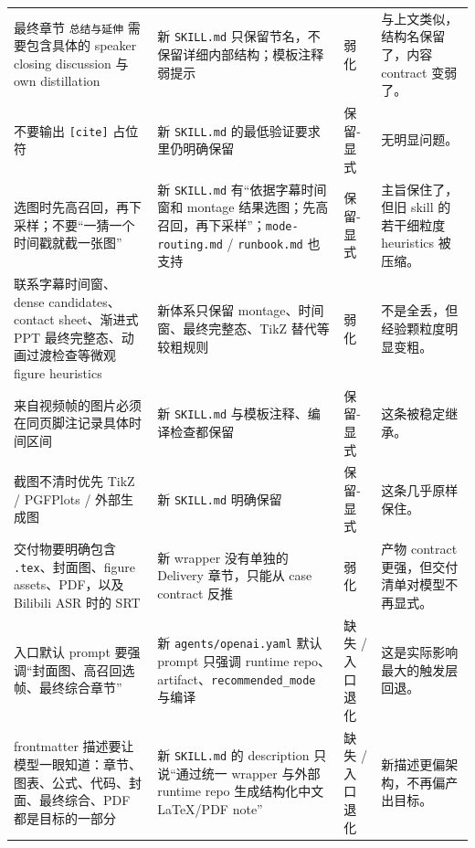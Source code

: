 \documentclass[a4paper]{article}
\begin{document}
\begin{longtable}{p{3.1cm}p{5.1cm}p{1.8cm}p{4.7cm}}
最终章节 \texttt{总结与延伸} 需要包含具体的 speaker closing discussion 与 own distillation & 新 \texttt{SKILL.md} 只保留节名，不保留详细内部结构；模板注释弱提示 & 弱化 & 与上文类似，结构名保留了，内容 contract 变弱了。 \\

不要输出 \texttt{[cite]} 占位符 & 新 \texttt{SKILL.md} 的最低验证要求里仍明确保留 & 保留-显式 & 无明显问题。 \\

选图时先高召回，再下采样；不要“一猜一个时间戳就截一张图” & 新 \texttt{SKILL.md} 有“依据字幕时间窗和 montage 结果选图；先高召回，再下采样”；\texttt{mode-routing.md} / \texttt{runbook.md} 也支持 & 保留-显式 & 主旨保住了，但旧 skill 的若干细粒度 heuristics 被压缩。 \\

联系字幕时间窗、dense candidates、contact sheet、渐进式 PPT 最终完整态、动画过渡检查等微观 figure heuristics & 新体系只保留 montage、时间窗、最终完整态、TikZ 替代等较粗规则 & 弱化 & 不是全丢，但经验颗粒度明显变粗。 \\

来自视频帧的图片必须在同页脚注记录具体时间区间 & 新 \texttt{SKILL.md} 与模板注释、编译检查都保留 & 保留-显式 & 这条被稳定继承。 \\

截图不清时优先 TikZ / PGFPlots / 外部生成图 & 新 \texttt{SKILL.md} 明确保留 & 保留-显式 & 这条几乎原样保住。 \\

交付物要明确包含 \texttt{.tex}、封面图、figure assets、PDF，以及 Bilibili ASR 时的 SRT & 新 wrapper 没有单独的 Delivery 章节，只能从 case contract 反推 & 弱化 & 产物 contract 更强，但交付清单对模型不再显式。 \\

入口默认 prompt 要强调“封面图、高召回选帧、最终综合章节” & 新 \texttt{agents/openai.yaml} 默认 prompt 只强调 runtime repo、artifact、\texttt{recommended\_mode} 与编译 & 缺失 / 入口退化 & 这是实际影响最大的触发层回退。 \\

frontmatter 描述要让模型一眼知道：章节、图表、公式、代码、封面、最终综合、PDF 都是目标的一部分 & 新 \texttt{SKILL.md} 的 description 只说“通过统一 wrapper 与外部 runtime repo 生成结构化中文 LaTeX/PDF note” & 缺失 / 入口退化 & 新描述更偏架构，不再偏产出目标。 \\

\bottomrule
\end{longtable}
\normalsize
\end{document}
